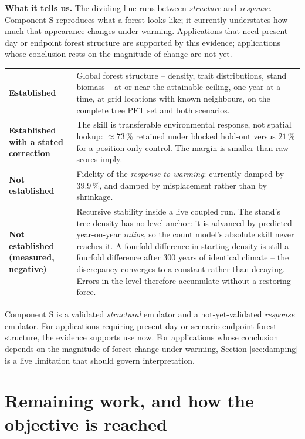 \documentclass[11pt]{article}
\begin{document}
\begin{table}[h]
{\textbf{What it tells us.} The dividing line runs between \emph{structure} and \emph{response}. Component S reproduces what a forest looks like; it currently understates how much that appearance changes under warming. Applications that need present-day or endpoint forest structure are supported by this evidence; applications whose conclusion rests on the magnitude of change are not yet.}
\label{tab:status}
\small
\begin{tabular}{p{5.6cm}p{9.4cm}}
\toprule
\textbf{Established} & Global forest structure -- density, trait distributions, stand biomass -- at or near the attainable ceiling, one year at a time, at grid locations with known neighbours, on the complete tree PFT set and both scenarios. \\
\addlinespace
\textbf{Established with a stated correction} & The skill is transferable environmental response, not spatial lookup: $\approx 73$\,\% retained under blocked hold-out versus $21$\,\% for a position-only control. The margin is smaller than raw scores imply. \\
\addlinespace
\textbf{Not established} & Fidelity of the \emph{response to warming}: currently damped by $39.9$\,\%, and damped by misplacement rather than by shrinkage. \\
\addlinespace
\textbf{Not established (measured, negative)} & Recursive stability inside a live coupled run. The stand's tree density has no level anchor: it is advanced by predicted year-on-year \emph{ratios}, so the count model's absolute skill never reaches it. A fourfold difference in starting density is still a fourfold difference after 300 years of identical climate -- the discrepancy converges to a constant rather than decaying. Errors in the level therefore accumulate without a restoring force. \\
\bottomrule
\end{tabular}
\end{table}

Component S is a validated \emph{structural} emulator and a not-yet-validated \emph{response} emulator. For applications requiring present-day or scenario-endpoint forest structure, the evidence supports use now. For applications whose conclusion depends on the magnitude of forest change under warming, Section \ref{sec:damping} is a live limitation that should govern interpretation.

\section{Remaining work, and how the objective is reached}
\label{sec:roadmap}
\end{document}
